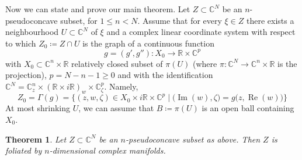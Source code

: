 \documentclass[reqno,oneside]{amsart}
\newcommand{\numberset}{\mathbb}
\newcommand{\R}{\numberset{R}}
\newcommand{\C}{\numberset{C}}
\DeclareMathOperator{\Realpart}{Re}
\renewcommand{\Re}{\Realpart}
\DeclareMathOperator{\Impart}{Im}
\renewcommand{\Im}{\Impart}
\theoremstyle{definition}
\theoremstyle{plain}
\newtheorem{theorem}[definition]{Theorem}
\theoremstyle{remark}
\begin{document}
Now we can state and prove our main theorem. Let $Z\subset\C^N$ be an $n$-pseudo\-concave subset, for $1\leq n<N$. Assume that for every $\xi\in Z$ there exists a neighbourhood $U\subset\C^N$ of $\xi$ and a complex linear coordinate system with respect to which $Z_0\coloneqq Z\cap U$ is the graph of a continuous function 
\[
    g=(g',g''):X_0\to \R\times\C^p
\]    
with $X_0\subset\C^n\times\R$ relatively closed subset of $\pi(U)$ (where $\pi:\C^N\to\C^n\times\R$ is the projection), $p=N-n-1\geq0$ and with the identification $\C^N=\C^n_z\times(\R\times i\R)_w\times\C^p_\zeta$. Namely,
\begin{equation}
\label{eq:locmaxsetform}
    Z_0=\Gamma(g)=\bigl\{(z,w,\zeta)\in X_0\times i\R\times\C^p \mid \bigl(\Im(w),\zeta\bigr)=g\bigl(z,\Re(w)\bigr)\bigr\}
\end{equation}
At most shrinking $U$, we can assume that $B\coloneqq\pi(U)$ is an open ball containing $X_0$.
\begin{theorem}
\label{thm:foliation'}
    Let $Z\subset\C^N$ be an $n$-pseudoconcave subset as above. Then $Z$ is foliated by $n$-dimensional complex manifolds.
\end{theorem}
\end{document}
